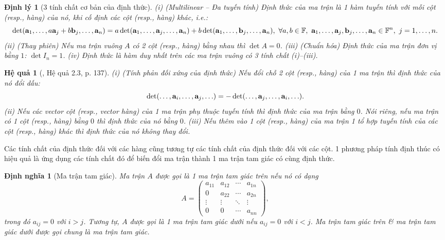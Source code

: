 \documentclass{article}
\newtheorem{dinhly}{Định lý}
\newtheorem{dinhnghia}{Định nghĩa}
\newtheorem{hequa}{Hệ quả}
\begin{document}
\begin{dinhly}[3 tính chất cơ bản của định thức]
	(i) {\rm(Multilinear -- Đa tuyến tính)} Định thức của ma trận là 1 hàm tuyến tính với mỗi cột (resp., hàng) của nó, khi cố định các cột (resp., hàng) khác, i.e.:
	\begin{equation*}
		\det({\bf a}_1,\ldots,a{\bf a}_j + b{\bf b}_j,\ldots,{\bf a}_n) = a\det({\bf a}_1,\ldots,{\bf a}_j,\ldots,{\bf a}_n) + b\det({\bf a}_1,\ldots,{\bf b}_j,\ldots,{\bf a}_n),\ \forall a,b\in\mathbb{F},\ {\bf a}_1,\ldots,{\bf a}_j,{\bf b}_j,\ldots,{\bf a}_n\in\mathbb{F}^n,\ j = 1,\ldots,n.
	\end{equation*}
	(ii) {\rm(Thay phiên)} Nếu ma trận vuông $A$ có 2 cột (resp., hàng) bằng nhau thì $\det A = 0$. (iii) {\rm(Chuẩn hóa)} Định thức của ma trận đơn vị bằng $1$: $\det I_n = 1$. (iv) Định thức là hàm duy nhất trên các ma trận vuông có 3 tính chất (i)--(iii).
\end{dinhly}

\begin{hequa}[\cite{Hung_linear_algebra}, Hệ quả 2.3, p. 137]
	(i) {\rm(Tính phản đối xứng của định thức)} Nếu đổi chỗ 2 cột (resp., hàng) của 1 ma trận thì định thức của nó đổi dấu:
	\begin{equation*}
		\det(\ldots,{\bf a}_i,\ldots,{\bf a}_j,\ldots) = -\det(\ldots,{\bf a}_j,\ldots,{\bf a}_i,\ldots).
	\end{equation*}
	(ii) Nếu các vector cột (resp., vector hàng) của 1 ma trận phụ thuộc tuyến tính thì định thức của ma trận bằng $0$. Nói riêng, nếu ma trận có 1 cột (resp., hàng) bằng $0$ thì định thức của nó bằng $0$. (iii) Nếu thêm vào 1 cột (resp., hàng) của ma trận 1 tổ hợp tuyến tính của các cột (resp., hàng) khác thì định thức của nó không thay đổi.
\end{hequa}
Các tính chất của định thức đối với các hàng cũng tương tự các tính chất của định thức đối với các cột. 1 phương pháp tính định thúc có hiệu quả là ứng dụng các tính chất đó để biến đổi ma trận thành 1 ma trận tam giác có cùng định thức.

\begin{dinhnghia}[Ma trận tam giác]
	Ma trận $A$ được gọi là 1 {\rm ma trận tam giác trên} nếu nó có dạng
	\begin{equation*}
		A = \begin{pmatrix}
			a_{11} & a_{12} & \cdots & a_{1n}\\0 & a_{22} & \cdots & a_{2n}\\
			\vdots & \vdots & \ddots & \vdots\\0 & 0 & \cdots & a_{nn}
		\end{pmatrix},
	\end{equation*}
	trong đó $a_{ij} = 0$ với $i > j$. Tương tự, $A$ được gọi là 1 {\rm ma trận tam giác dưới} nếu $a_{ij} = 0$ với $i < j$. Ma trận tam giác trên \& ma trận tam giác dưới được gọi chung là {\rm ma trận tam giác}.
\end{dinhnghia}
\end{document}
